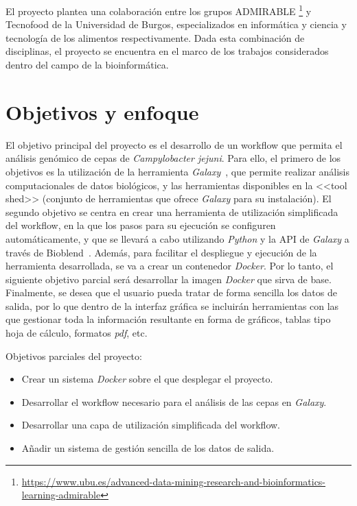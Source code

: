 El proyecto plantea una colaboración entre los grupos ADMIRABLE \footnote{\url{https://www.ubu.es/advanced-data-mining-research-and-bioinformatics-learning-admirable}} y Tecnofood de la Universidad de Burgos, especializados en informática y ciencia y tecnología de los alimentos respectivamente. Dada esta combinación de disciplinas, el proyecto se encuentra en el marco de los trabajos considerados dentro del campo de la bioinformática.


\section{Objetivos y enfoque}
El objetivo principal del proyecto es el desarrollo de un workflow que permita el análisis genómico de cepas de \textit{Campylobacter jejuni}. Para ello, el primero de los objetivos es la utilización de la herramienta \textit{Galaxy}~\cite{afgan2018galaxy}, que permite realizar análisis computacionales de datos biológicos, y las herramientas disponibles en la <<tool shed>> (conjunto de herramientas que ofrece \textit{Galaxy} para su instalación).
El segundo objetivo se centra en crear una herramienta de utilización simplificada del workflow, en la que los pasos para su ejecución se configuren automáticamente, y que se llevará a cabo utilizando \textit{Python} y la API de \textit{Galaxy} a través de Bioblend~\cite{Sloggett2013}. 
Además, para facilitar el despliegue y ejecución de la herramienta desarrollada, se va a crear un contenedor \textit{Docker}. Por lo tanto, el siguiente objetivo parcial será desarrollar la imagen \textit{Docker} que sirva de base.
Finalmente, se desea que el usuario pueda tratar de forma sencilla los datos de salida, por lo que dentro de la interfaz gráfica se incluirán herramientas con las que gestionar toda la información resultante en forma de gráficos, tablas tipo hoja de cálculo, formatos \textit{pdf}, etc.

Objetivos parciales del proyecto:
\begin{itemize}
\item Crear un sistema \textit{Docker} sobre el que desplegar el proyecto.
\item Desarrollar el workflow necesario para el análisis de las cepas en \textit{Galaxy}.
\item Desarrollar una capa de utilización simplificada del workflow.
\item Añadir un sistema de gestión sencilla de los datos de salida.
\end{itemize}

